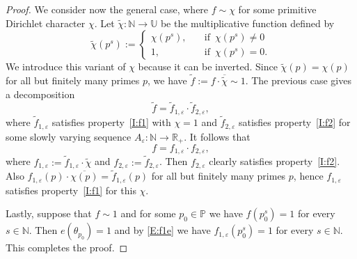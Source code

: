 \documentclass[11pt]{amsart}
\theoremstyle{definition}
\newcommand{\N}{{\mathbb N}}
\renewcommand{\P}{{\mathbb P}}
\newcommand{\R}{{\mathbb R}}
\newcommand{\U}{{\mathbb U}}
\begin{document}
\begin{proof}
 We consider now the general case, where $f\sim \chi$ for some primitive Dirichlet character $\chi$.
  Let $\tilde{\chi}\colon \N\to \U$ be the multiplicative function defined by
 $$
 \tilde{\chi}(p^s):=\begin{cases}
 	\chi(p^s), \quad &\text{if } \, \chi(p^s)\neq 0\\
 	1, \quad &\text{if } \, \chi(p^s)= 0.
 	 \end{cases}
 $$
 We introduce this variant of $\chi$ because it can be inverted.
 Since $\tilde{\chi}(p)=\chi(p)$ for all but finitely many primes $p$, we have
  $\tilde{f}:=f\cdot \overline{\tilde{\chi}}\sim 1$.  The previous case gives a decomposition
  $$
  \tilde{f}=\tilde{f}_{1,\varepsilon}\cdot \tilde{f}_{2,\varepsilon},
  $$
  where  $\tilde{f}_{1,\varepsilon}$ satisfies property~\eqref{I:f1} with $\chi=1$ and $\tilde{f}_{2,\varepsilon}$ satisfies property~\eqref{I:f2} for some slowly varying sequence $A_\varepsilon\colon \N\to \R_+$. It follows that
  $$
  f=f_{1,\varepsilon} \cdot f_{2,\varepsilon},
  $$
  where $f_{1,\varepsilon}:=\tilde{f}_{1,\varepsilon}\cdot \tilde{\chi}$ and $ f_{2,\varepsilon}:=\tilde{f}_{2,\varepsilon}$.  Then $f_{2,\varepsilon}$ clearly satisfies property~\eqref{I:f2}.   Also $f_{1,\varepsilon}(p)\cdot \overline{\chi(p)}=\tilde{f}_{1,\varepsilon}(p)$ for all but finitely many primes $p$, hence
  $f_{1,\varepsilon}$ satisfies property~\eqref{I:f1} for this $\chi$.

 
   Lastly, suppose that $f\sim 1$ and for  some $p_0\in \P$ we have $f(p_0^s)=1$ for every $s\in \N$. Then $e(\theta_{p_0})=1$ and by \eqref{E:f1e} we 
  have  $f_{1,\varepsilon}(p_0^s)=1$ for every $s\in \N$.
  This completes the proof.
 \end{proof}
\end{document}
